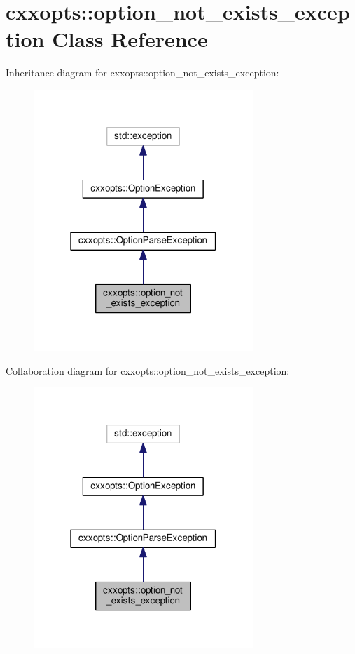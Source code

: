 \hypertarget{classcxxopts_1_1option__not__exists__exception}{}\section{cxxopts\+:\+:option\+\_\+not\+\_\+exists\+\_\+exception Class Reference}
\label{classcxxopts_1_1option__not__exists__exception}


Inheritance diagram for cxxopts\+:\+:option\+\_\+not\+\_\+exists\+\_\+exception\+:
\nopagebreak
\begin{figure}[H]
\begin{center}
\leavevmode
\includegraphics[width=235pt]{classcxxopts_1_1option__not__exists__exception__inherit__graph}
\end{center}
\end{figure}


Collaboration diagram for cxxopts\+:\+:option\+\_\+not\+\_\+exists\+\_\+exception\+:
\nopagebreak
\begin{figure}[H]
\begin{center}
\leavevmode
\includegraphics[width=235pt]{classcxxopts_1_1option__not__exists__exception__coll__graph}
\end{center}
\end{figure}
